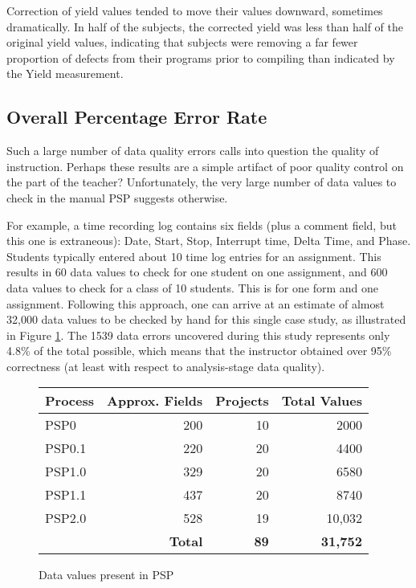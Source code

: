 Correction of yield values tended to move their values downward, sometimes
dramatically.  In half of the subjects, the corrected yield was less than
half of the original yield values, indicating that subjects were removing a
far fewer proportion of defects from their programs prior to compiling than
indicated by the Yield measurement.
   


\subsection{Overall Percentage Error Rate}
 
Such a large number of data quality errors calls into question the 
quality of instruction. Perhaps these results are a simple artifact of
poor quality control on the part of the teacher? Unfortunately, 
the very large number of data values to check in the manual PSP suggests
otherwise. 

For example, a time recording log contains six fields (plus a comment
field, but this one is extraneous): Date, Start, Stop, Interrupt time,
Delta Time, and Phase. Students typically entered about 10 time log entries
for an assignment.  This results in 60 data values to check for one student
on one assignment, and 600 data values to check for a class of 10 students.
This is for one form and one assignment. Following this approach, one can
arrive at an estimate of almost 32,000 data values to be checked by hand
for this single case study, as illustrated in Figure \ref{overallErrors}.
The 1539 data errors uncovered during this study represents only 4.8\% of
the total possible, which means that the instructor obtained over 95\%
correctness (at least with respect to analysis-stage data quality).

\begin{figure}
   \begin{center} 
   \begin{tabular}{|l|r|r|r|}\hline 
   Process & Approx. Fields & Projects & Total Values \\ \hline\hline 
   PSP0    & 200 &  10 &  2000 \\ \hline 
   PSP0.1  & 220 &  20 &  4400 \\ \hline 
   PSP1.0  & 329 &  20 &  6580 \\ \hline 
   PSP1.1  & 437 &  20 &  8740 \\ \hline  
   PSP2.0  & 528 &  19 &  10,032 \\ \hline 
   \multicolumn{2}{|r|}{\bf Total} &  {\bf 89} &  {\bf 31,752} \\ \hline 
   \end{tabular} \newline \newline
   \end{center} 
   \caption{\label{overallErrors}Data values present in PSP}
\end{figure}





